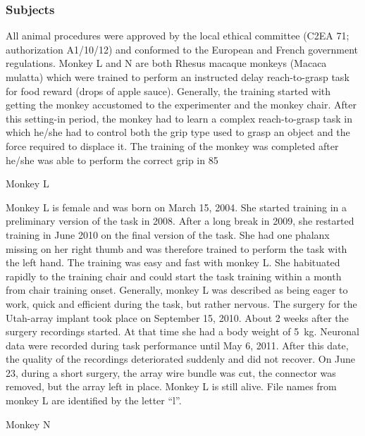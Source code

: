 \subsubsection{Subjects}

All animal procedures were approved by the local ethical committee (C2EA 71; authorization A1/10/12) and conformed to the European and French government regulations. Monkey L and N are both Rhesus macaque monkeys (Macaca mulatta) which were trained to perform an instructed delay reach-to-grasp task for food reward (drops of apple sauce). Generally, the training started with getting the monkey accustomed to the experimenter and the monkey chair. After this setting-in period, the monkey had to learn a complex reach-to-grasp task in which he/she had to control both the grip type used to grasp an object and the force required to displace it. The training of the monkey was completed after he/she was able to perform the correct grip in 85%

Monkey L 

Monkey L is female and was born on March 15, 2004. She started training in a preliminary version of the task in 2008. After a long break in 2009, she restarted training in June 2010 on the final version of the task. She had one phalanx missing on her right thumb and was therefore trained to perform the task with the left hand. The training was easy and fast with monkey L. She habituated rapidly to the training chair and could start the task training within a month from chair training onset. Generally, monkey L was described as being eager to work, quick and efficient during the task, but rather nervous. The surgery for the Utah-array implant took place on September 15, 2010. About 2 weeks after the surgery recordings started. At that time she had a body weight of 5 kg. Neuronal data were recorded during task performance until May 6, 2011. After this date, the quality of the recordings deteriorated suddenly and did not recover. On June 23, during a short surgery, the array wire bundle was cut, the connector was removed, but the array left in place. Monkey L is still alive. File names from monkey L are identified by the letter “l”.

Monkey N 

